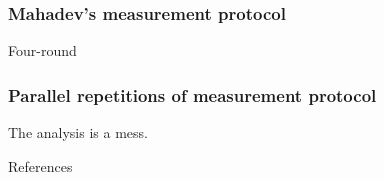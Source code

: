 \documentclass{beamer}
\begin{document}
\begin{frame}
	\frametitle{Mahadev's measurement protocol}
	Four-round

\end{frame}

\begin{frame}
	\frametitle{Parallel repetitions of measurement protocol}
	The analysis is a mess.
\end{frame}

\begin{frame}{References}
	
	
\end{frame}
\end{document}
